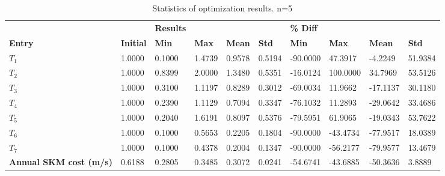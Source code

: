 \begin{table}[H]
\centering
\begin{tabular}{llllllllll}
\textbf{} & \textbf{} & \cellcolor[HTML]{EFEFEF}\textbf{Results} & \cellcolor[HTML]{EFEFEF} & \cellcolor[HTML]{EFEFEF} & \cellcolor[HTML]{EFEFEF} & \cellcolor[HTML]{EFEFEF}\textbf{\% Diff} & \cellcolor[HTML]{EFEFEF} & \cellcolor[HTML]{EFEFEF} & \cellcolor[HTML]{EFEFEF} \\
\rowcolor[HTML]{EFEFEF} 
\textbf{Entry} & \textbf{Initial} & \textbf{Min} & \textbf{Max} & \textbf{Mean} & \textbf{Std} & \textbf{Min} & \textbf{Max} & \textbf{Mean} & \textbf{Std} \\
$T_{1}$ & 1.0000 & 0.1000 & 1.4739 & 0.9578 & 0.5194 & -90.0000 & 47.3917 & -4.2249 & 51.9384 \\ 
$T_{2}$ & 1.0000 & 0.8399 & 2.0000 & 1.3480 & 0.5351 & -16.0124 & 100.0000 & 34.7969 & 53.5126 \\ 
$T_{3}$ & 1.0000 & 0.3100 & 1.1197 & 0.8289 & 0.3012 & -69.0034 & 11.9662 & -17.1137 & 30.1180 \\ 
$T_{4}$ & 1.0000 & 0.2390 & 1.1129 & 0.7094 & 0.3347 & -76.1032 & 11.2893 & -29.0642 & 33.4686 \\ 
$T_{5}$ & 1.0000 & 0.2040 & 1.6191 & 0.8097 & 0.5376 & -79.5951 & 61.9065 & -19.0343 & 53.7622 \\ 
$T_{6}$ & 1.0000 & 0.1000 & 0.5653 & 0.2205 & 0.1804 & -90.0000 & -43.4734 & -77.9517 & 18.0389 \\ 
$T_{7}$ & 1.0000 & 0.1000 & 0.4378 & 0.2004 & 0.1347 & -90.0000 & -56.2177 & -79.9577 & 13.4679 \\ 
\rowcolor[HTML]{EFEFEF} 
\textbf{Annual SKM cost (m/s)} & 0.6188 & 0.2805 & 0.3485 & 0.3072 & 0.0241 & -54.6741 & -43.6885 & -50.3636 & 3.8889 \\ 
\end{tabular}
\caption{Statistics of optimization results. n=5}
\label{tab:StatisticsOptimizationAnalysis}
\end{table}